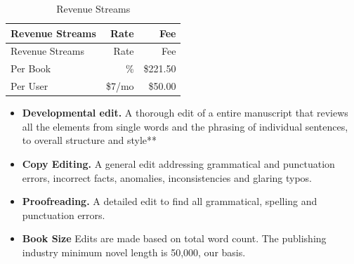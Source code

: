 \documentclass[11pt,openany]{book}
\begin{document}
\begin{longtable}[]{@{}lrr@{}}
\caption{Revenue Streams}\tabularnewline
\toprule
\begin{minipage}[b]{0.30\columnwidth}\raggedright
Revenue Streams\strut
\end{minipage} & \begin{minipage}[b]{0.18\columnwidth}\raggedleft
Rate\strut
\end{minipage} & \begin{minipage}[b]{0.11\columnwidth}\raggedleft
Fee\strut
\end{minipage}\tabularnewline
\midrule
\endfirsthead
\toprule
\begin{minipage}[b]{0.30\columnwidth}\raggedright
Revenue Streams\strut
\end{minipage} & \begin{minipage}[b]{0.18\columnwidth}\raggedleft
Rate\strut
\end{minipage} & \begin{minipage}[b]{0.11\columnwidth}\raggedleft
Fee\strut
\end{minipage}\tabularnewline
\midrule
\endhead
\begin{minipage}[t]{0.30\columnwidth}\raggedright
Per Book\strut
\end{minipage} & \begin{minipage}[t]{0.18\columnwidth}\raggedleft
10\%\strut
\end{minipage} & \begin{minipage}[t]{0.11\columnwidth}\raggedleft
\$221.50\strut
\end{minipage}\tabularnewline
\begin{minipage}[t]{0.30\columnwidth}\raggedright
Per User\strut
\end{minipage} & \begin{minipage}[t]{0.18\columnwidth}\raggedleft
\$7/mo\strut
\end{minipage} & \begin{minipage}[t]{0.11\columnwidth}\raggedleft
\$50.00\strut
\end{minipage}\tabularnewline
\bottomrule
\end{longtable}

\begin{itemize}
\item
  \textbf{Developmental edit.} A thorough edit of a entire manuscript
  that reviews all the elements from single words and the phrasing of
  individual sentences, to overall structure and style**
\item
  \textbf{Copy Editing.} A general edit addressing grammatical and
  punctuation errors, incorrect facts, anomalies, inconsistencies and
  glaring typos.
\item
  \textbf{Proofreading.} A detailed edit to find all grammatical,
  spelling and punctuation errors.
\item
  \textbf{Book Size} Edits are made based on total word count. The
  publishing industry minimum novel length is 50,000, our basis.
\end{itemize}
\end{document}
